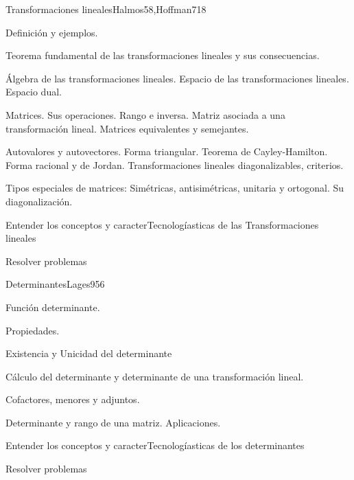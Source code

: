 \begin{syllabus}
\begin{unit}{Transformaciones lineales}{Halmos58,Hoffman71}{8}
   \begin{topics}
         \item  Definición y ejemplos.
	 \item  Teorema fundamental de las transformaciones lineales y sus consecuencias.
         \item  Álgebra de las transformaciones lineales. Espacio de las transformaciones lineales. Espacio dual.
	 \item  Matrices. Sus operaciones. Rango e inversa. Matriz asociada a una transformación lineal. Matrices equivalentes y semejantes.
         \item  Autovalores y autovectores. Forma triangular. Teorema de Cayley-Hamilton. Forma racional y de  Jordan. Transformaciones lineales diagonalizables, criterios.
	 \item  Tipos especiales de matrices: Simétricas, antisimétricas, unitaria y ortogonal. Su diagonalización.
   \end{topics}

   \begin{unitgoals}
         \item  Entender los conceptos y caracterTecnologíasticas de las Transformaciones lineales
         \item  Resolver problemas
   \end{unitgoals}
\end{unit}

\begin{unit}{Determinantes}{Lages95}{6}
   \begin{topics}
         \item  Función determinante.
	 \item  Propiedades.
         \item  Existencia y Unicidad del determinante
	 \item  Cálculo del determinante y determinante de una transformación lineal.
         \item  Cofactores, menores y adjuntos.
	\item Determinante y rango de una matriz. Aplicaciones.
   \end{topics}

   \begin{unitgoals}
         \item  Entender los conceptos y caracterTecnologíasticas de los determinantes
         \item  Resolver problemas
   \end{unitgoals}
\end{unit}


\end{syllabus}
